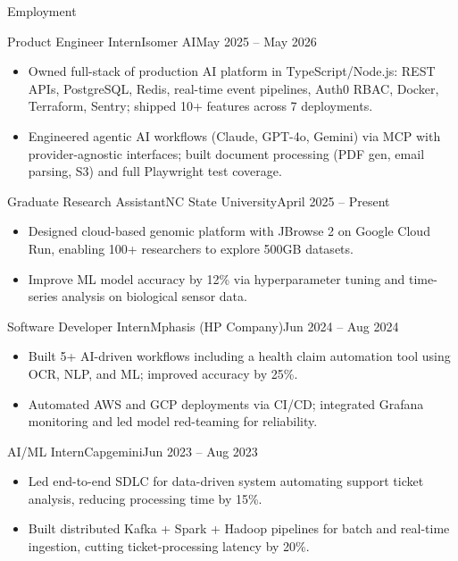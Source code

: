 \documentclass[]{mcdowellcv}
\begin{document}
\makeheader

\begin{cvsection}{Employment}
  \begin{cvsubsection}{Product Engineer Intern}{Isomer AI}{May 2025 -- May 2026}
    \begin{itemize}
      \item Owned full-stack of production AI platform in TypeScript/Node.js: REST APIs, PostgreSQL, Redis, real-time event pipelines, Auth0 RBAC, Docker, Terraform, Sentry; shipped 10+ features across 7 deployments.
      \item Engineered agentic AI workflows (Claude, GPT-4o, Gemini) via MCP with provider-agnostic interfaces; built document processing (PDF gen, email parsing, S3) and full Playwright test coverage.
    \end{itemize}
    \vspace{-1.5pt}
  \end{cvsubsection}

  \begin{cvsubsection}{Graduate Research Assistant}{NC State University}{April 2025 -- Present}
    \begin{itemize}
      \item Designed cloud-based genomic platform with JBrowse 2 on Google Cloud Run, enabling 100+ researchers to explore 500GB datasets.
      \item Improve ML model accuracy by 12\% via hyperparameter tuning and time-series analysis on biological sensor data.
    \end{itemize}
    \vspace{-1.5pt}
  \end{cvsubsection}

  \begin{cvsubsection}{Software Developer Intern}{Mphasis (HP Company)}{Jun 2024 -- Aug 2024}
    \begin{itemize}
      \item Built 5+ AI-driven workflows including a health claim automation tool using OCR, NLP, and ML; improved accuracy by 25\%.
      \item Automated AWS and GCP deployments via CI/CD; integrated Grafana monitoring and led model red-teaming for reliability.
    \end{itemize}
    \vspace{-1.5pt}
  \end{cvsubsection}

  \begin{cvsubsection}{AI/ML Intern}{Capgemini}{Jun 2023 -- Aug 2023}
    \begin{itemize}
      \item Led end-to-end SDLC for data-driven system automating support ticket analysis, reducing processing time by 15\%.
      \item Built distributed Kafka + Spark + Hadoop pipelines for batch and real-time ingestion, cutting ticket-processing latency by 20\%.
    \end{itemize}
    \vspace{-1.5pt}
  \end{cvsubsection}
\end{cvsection}
\end{document}
